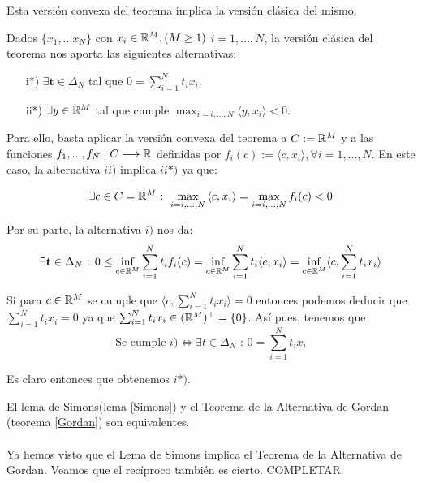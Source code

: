 	\begin{observacion}
		Esta versión convexa del teorema implica la versión clásica del mismo.
	\end{observacion}

	Dados $ \{x_1,...x_N\}$ con $ x_i \in \mathbb{R}^M , (M \geq 1 )$ $i=1,...,N$, la versión clásica del teorema nos aporta las siguientes alternativas:

	\begin{itemize}
		\item[i*)] $ \exists \mathbf{t} \in \Delta_N $ tal que $ 0 = \sum_{i=1}^{N}{t_i x_i}$.
		\item[ii*)] $ \exists y \in \mathbb{R}^M $ tal que cumple $ \max_{i=i,...,N} \langle y, x_i \rangle < 0 $.
	\end{itemize}

	Para ello, basta aplicar la versión convexa del teorema a $ C := \mathbb{R}^M $ y a las funciones $ f_1,...,f_N : C \longrightarrow \mathbb{R} $ definidas por $ f_i(c):=\langle c,x_i \rangle , \forall i=1,...,N  $. En este caso, la alternativa $ ii) $ implica $ ii*) $ ya que:
	
	\begin{equation*}
		\exists c \in C = \mathbb{R}^M \text{ : } \max_{i=i,...,N} {\langle c,x_i \rangle}  =  \max_{i=i,...,N}f_i (c) < 0 
	\end{equation*}
	
	Por su parte, la alternativa $ i) $ nos da:
	\begin{equation*}
		\exists \mathbf{t} \in \Delta_N \text{ : } 0 \leq \inf_{c \in \mathbb{R}^M}  \sum_{i=1}^{N}{t_i f_i(c) } = \inf_{c \in \mathbb{R}^M} \sum_{i=1}^{N}{t_i\langle c,x_i \rangle} = \inf_{c \in \mathbb{R}^M} \langle c, \sum_{i=1}^{N}{t_i x_i} \rangle
	\end{equation*}
	
	Si para $ c \in \mathbb{R}^M $ se cumple que $ \langle c, \sum_{i=1}^{N}{t_i x_i} \rangle = 0 $ entonces podemos deducir que $ \sum_{i=1}^{N}{t_i x_i} = 0 $	ya que $ \sum_{i=1}^{N}{t_i x_i} \in (\mathbb{R}^M)^{\perp} = \{0\} $. Así pues, tenemos que
	\begin{equation*}
		\text{Se cumple }i) \Longleftrightarrow \exists t \in \Delta_N \text{ : }  0 = \sum_{i=1}^{N}{t_i x_i}
	\end{equation*}
	
	Es claro entonces que obtenemos $ i*) $.
	
	\begin{observacion}
		El lema de Simons(lema \ref{Simons}) y el Teorema de la Alternativa de Gordan (teorema \ref{Gordan}) son equivalentes.
	\end{observacion}

	\paragraph{} Ya hemos visto que el Lema de Simons implica el Teorema de la Alternativa de Gordan. Veamos que el recíproco también es cierto.  
	COMPLETAR.